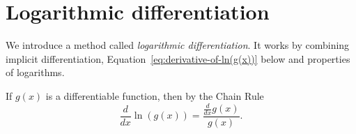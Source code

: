 \documentclass[../main.tex]{subfiles}
\begin{document}
 \section{Logarithmic differentiation}
  We introduce a method called \emph{logarithmic differentiation}. It works by combining implicit differentiation, Equation~\eqref{eq:derivative-of-ln(g(x))} below and properties of logarithms.
  \begin{mdframed}[style=withref]
    If \(g(x)\) is a differentiable function, then by the Chain Rule
    \begin{equation} \label{eq:derivative-of-ln(g(x))}
      \frac{d}{dx} \ln( g(x) ) = \frac{\frac{d}{dx}g(x)}{g(x)}.
    \end{equation}

  \end{mdframed}

\end{document}
